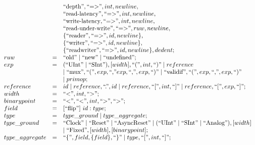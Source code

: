 \begin{figure}[t]
{\[\begin{array}{l l l}
 & & \mbox{``depth''}, \mbox{``=>''}, int, newline, \\
 & & \mbox{``read-latency''}, \mbox{``=>''}, int, newline, \\ 
 & & \mbox{``write-latency}, \mbox{``=>''}, int, newline,  \\
 & & \mbox{``read-under-write''}, \mbox{``=>''}, ruw, newline, \\
  & & \{\mbox{``reader''}, \mbox{``=>''}, id, newline\}, \\
  & & \{\mbox{``writer''}, \mbox{``=>''}, id, newline\}, \\
  & & \{\mbox{``readwriter''}, \mbox{``=>''}, id, newline\}, dedent;\\    
%
ruw & = & \mbox{``old''} \mid \mbox{``new''} \mid \mbox{``undefined''};\\
%
exp & = & (\mbox{``UInt''} \mid \mbox{``SInt''}), [width], \mbox{``(''}, int, \mbox{``)''} \mid reference \\
& & \mid  \mbox{``mux''}, \mbox{``(''}, exp, \mbox{``,''} exp, \mbox{``,''}, exp, \mbox{``)''} \mid \mbox{``validif''}, \mbox{``(''}, exp, \mbox{``,''}, exp, \mbox{``)''}\\
& & \mid primop;\\
%
reference & = & id \mid reference, \mbox{``.''}, id \mid reference, \mbox{``[''}, int, \mbox{``]''} \mid reference, \mbox{``[''}, exp, \mbox{``]''};\\
%
width & = & \mbox{``<''}, int, \mbox{``>''};\\
%
binarypoint & = & \mbox{``<''}, \mbox{``<''}, int, \mbox{``>''}, \mbox{``>''};\\
%
 field & = & [\mbox{``flip''}]\ id: type;\\
%
type & = & type\_ground \mid type\_aggregate; \\
 type\_ground & = &  \mbox{``Clock''} \mid \mbox{``Reset''} \mid \mbox{``AsyncReset''} \mid (\mbox{``UInt''} \mid \mbox{``SInt''}  \mid \mbox{``Analog''}), [width]  \\
 & & \mid \mbox{``Fixed''}, [width], [binarypoint];\\
  type\_aggregate & = & \mbox{``\{''}, field, \{field\}, \mbox{``\}''} \mid type, \mbox{``[''}, int, \mbox{``]''};\\

\end{array}\]}
\end{figure}
